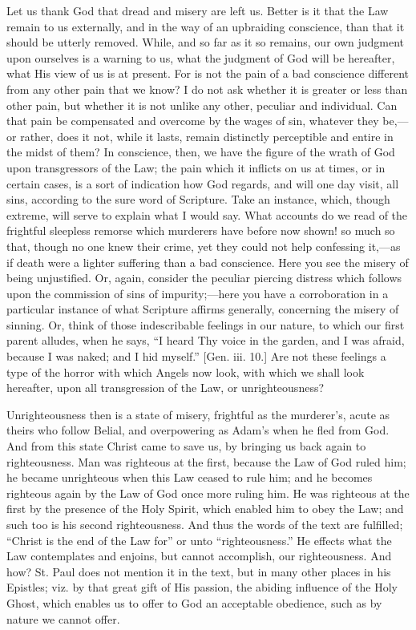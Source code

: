 Let us thank God that dread and misery are left us. Better is it
that the Law remain to us externally, and in the way of an upbraiding
conscience, than that it should be utterly removed. While, and so far
as it so remains, our own judgment upon ourselves is a warning to us,
what the judgment of God will be hereafter, what His view of us is at
present. For is not the pain of a bad conscience different from any
other pain that we know? I do not ask whether it is greater or less
than other pain, but whether it is not unlike any other, peculiar and
individual. Can that pain be compensated and overcome by the wages of
sin, whatever they be,—or rather, does it not, while it lasts,
remain distinctly perceptible and entire in the midst of them? In
conscience, then, we have the figure of the wrath of God upon
transgressors of the Law; the pain which it inflicts on us at times,
or in certain cases, is a sort of indication how God regards, and will
one day visit, all sins, according to the sure word of Scripture. Take
an instance, which, though extreme, will serve to explain what I would
say. What accounts do we read of the frightful sleepless remorse which
murderers have before now shown! so much so that, though no one knew
their crime, yet they could not help confessing it,—as if death were
a lighter suffering than a bad conscience. Here you see the misery of
being unjustified. Or, again, consider the peculiar piercing distress
which follows upon the commission of sins of impurity;—here you have
a corroboration in a particular instance of what Scripture affirms
generally, concerning the misery of sinning. Or, think of those
indescribable feelings in our nature, to which our first parent
alludes, when he says, ``I heard Thy voice in the garden, and I
was afraid, because I was naked; and I hid myself.'' [Gen. iii.
10.] Are not these feelings a type of the horror with which Angels now
look, with which we shall look hereafter, upon all transgression of
the Law, or unrighteousness?

Unrighteousness then is a state of misery, frightful as the
murderer's, acute as theirs who follow Belial, and overpowering as
Adam's when he fled from God. And from this state Christ came to save
us, by bringing us back again to righteousness. Man was righteous at
the first, because the Law of God ruled him; he became unrighteous
when this Law ceased to rule him; and he becomes righteous again by
the Law of God once more ruling him. He was righteous at the first by
the presence of the Holy Spirit, which enabled him to obey the Law;
and such too is his second righteousness. And thus the words of the
text are fulfilled; ``Christ is the end of the Law for'' or
unto ``righteousness.'' He effects what the Law contemplates
and enjoins, but cannot accomplish, our righteousness. And how? St.
Paul does not mention it in the text, but in many other places in his
Epistles; viz. by that great gift of His passion, the abiding
influence of the Holy Ghost, which enables us to offer to God an
acceptable obedience, such as by nature we cannot offer.


